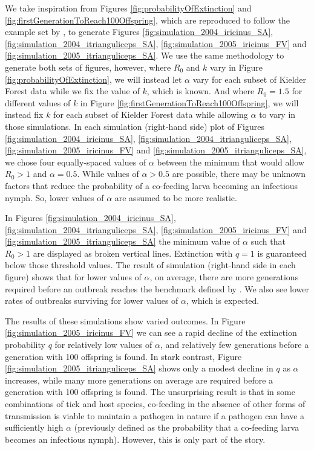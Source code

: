 \documentclass[hidelinks]{article}
\begin{document}
We take inspiration from Figures \ref{fig:probabilityOfExtinction} and  \ref{fig:firstGenerationToReach100Offspring}, which are reproduced to follow the example set by \citet{LloydSmith2005}, to generate Figures \ref{fig:simulation_2004_iricinus_SA}, \ref{fig:simulation_2004_itrianguliceps_SA}, \ref{fig:simulation_2005_iricinus_FV} and \ref{fig:simulation_2005_itrianguliceps_SA}. We use the same methodology to generate both sets of figures, however, where $ R_0 $ and $ k $ vary in Figure \ref{fig:probabilityOfExtinction}, we will instead let $ \alpha $ vary for each subset of Kielder Forest data while we fix the value of $ k $, which is known. And where $ R_0=1.5 $ for different values of $ k $ in Figure \ref{fig:firstGenerationToReach100Offspring}, we will instead fix $ k $ for each subset of Kielder Forest data while allowing $ \alpha $ to vary in those simulations. In each simulation (right-hand side) plot of Figures \ref{fig:simulation_2004_iricinus_SA}, \ref{fig:simulation_2004_itrianguliceps_SA}, \ref{fig:simulation_2005_iricinus_FV} and \ref{fig:simulation_2005_itrianguliceps_SA}, we chose four equally-spaced values of $ \alpha $ between the minimum that would allow $ R_0 > 1 $ and $ \alpha=0.5 $. While values of $ \alpha > 0.5 $ are possible, there may be unknown factors that reduce the probability of a co-feeding larva becoming an infectious nymph. So, lower values of $ \alpha $ are assumed to be more realistic. 

In Figures \ref{fig:simulation_2004_iricinus_SA}, \ref{fig:simulation_2004_itrianguliceps_SA}, \ref{fig:simulation_2005_iricinus_FV} and \ref{fig:simulation_2005_itrianguliceps_SA} the minimum value of $ \alpha $ such that $ R_0 > 1 $ are displayed as broken vertical lines. Extinction with $ q=1 $ is guaranteed below those threshold values. The result of simulation (right-hand side in each figure) shows that for lower values of $ \alpha $, on average, there are more generations required before an outbreak reaches the benchmark defined by \citet{LloydSmith2005}. We also see lower rates of outbreaks surviving for lower values of $ \alpha $, which is expected.

The results of these simulations show varied outcomes. In Figure \ref{fig:simulation_2005_iricinus_FV} we can see a rapid decline of the extinction probability $ q $ for relatively low values of $ \alpha $, and relatively few generations before a generation with 100 offspring is found. In stark contrast, Figure \ref{fig:simulation_2005_itrianguliceps_SA} shows only a modest decline in $ q $ as $ \alpha $ increases, while many more generations on average are required before a generation with 100 offspring is found. The unsurprising result is that in some combinations of tick and host species, co-feeding in the absence of other forms of transmission is viable to maintain a pathogen in nature if a pathogen can have a sufficiently high $ \alpha $ (previously defined as the probability that a co-feeding larva becomes an infectious nymph). However, this is only part of the story.
\end{document}
